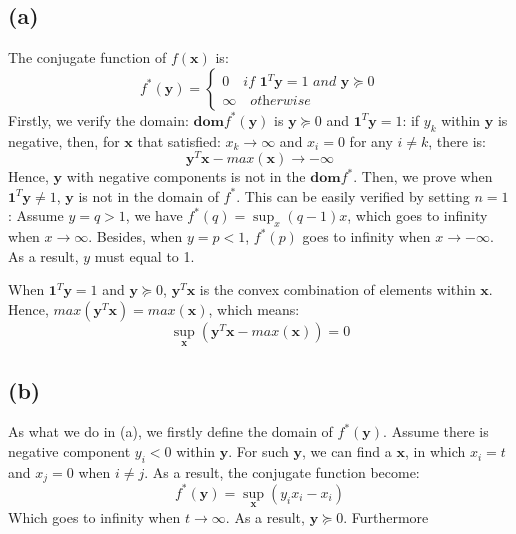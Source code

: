 \documentclass[10pt,a4paper]{article}
\begin{document}
\subsection*{(a)}
The conjugate function of $f(\mathbf{x})$ is:
\begin{equation*}
	f^{*}(\mathbf{y}) = 
	\begin{cases}
		0 \quad \textit{if } \mathbf{1}^{T} \mathbf{y} = 1 \textit{ and } \mathbf{y} \succeq 0  \\
		\infty \quad \textit{otherwise}
	\end{cases}
\end{equation*}
Firstly, we verify the domain: $\textbf{dom}f^{*}(\mathbf{y})$ is $\mathbf{y} \succeq 0$ and $\mathbf{1}^{T} \mathbf{y} = 1$: if $y_{k}$ within $\mathbf{y}$ is negative, then, for $\mathbf{x}$ that satisfied: $x_{k} \rightarrow \infty$ and $x_{i} = 0$ for any $i \neq k$, there is:
\begin{equation*}
	\mathbf{y}^{T} \mathbf{x} - max(\mathbf{x}) \rightarrow -\infty
\end{equation*}
Hence, $\mathbf{y}$ with negative components is not in the $\textbf{dom}f^{*}$. Then, we prove when $\mathbf{1}^{T} \mathbf{y} \neq 1$, $\mathbf{y}$ is not in the domain of $f^{*}$. This can be easily verified by setting $n = 1$: Assume $y = q > 1$, we have $f^{*}(q) = \displaystyle\sup_{x}(q - 1)x$, which goes to infinity when $x \rightarrow \infty$. Besides, when $y = p < 1$, $f^{*}(p)$ goes to infinity when $x \rightarrow -\infty$. As a result, $y$ must equal to 1.

When $\mathbf{1}^{T} \mathbf{y} = 1$ and $\mathbf{y} \succeq 0$, $\mathbf{y}^{T} \mathbf{x}$ is the convex combination of elements within $\mathbf{x}$. Hence, $max(\mathbf{y}^{T} \mathbf{x}) = max(\mathbf{x})$, which means:
\begin{equation*}
	\displaystyle\sup_{\mathbf{x}}(\mathbf{y}^{T} \mathbf{x} - max(\mathbf{x})) = 0
\end{equation*} 
\subsection*{(b)}
As what we do in (a), we firstly define the domain of $f^{*}(\mathbf{y})$. Assume there is negative component $y_{i} < 0$ within $\mathbf{y}$. For such $\mathbf{y}$, we can find a $\mathbf{x}$, in which $x_{i} = t$ and $x_{j} = 0$ when $i \neq j$. As a result, the conjugate function become:
\begin{equation*}
	f^{*}(\mathbf{y}) = \displaystyle\sup_{\mathbf{x}}(y_{i} x_{i} - x_{i})
\end{equation*}
Which goes to infinity when $t \rightarrow \infty$. As a result, $\mathbf{y} \succeq 0$. Furthermore
\end{document}

